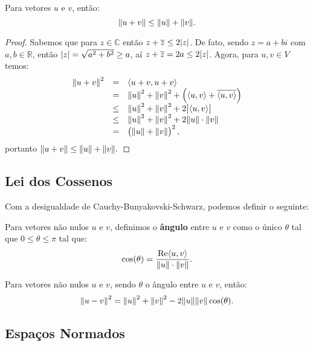 \documentclass[11pt,twoside,a4paper]{book}
\begin{document}
\begin{proposicao}\label{norma2}
Para vetores $u$ e $v$, então:
\[
\norm{u+v}\leq\norm{u}+\norm{v}.
\]
\end{proposicao}
\begin{proof}
Sabemos que para $z\in\mathbb{C}$ então $z+\overline{z}\leq 2\abs{z}$. De fato, sendo $z=a+bi$ com $a,b\in\mathbb{R}$, então $\abs{z}=\sqrt{a^2+b^2}\geq a$, aí $z+\overline{z}=2a\leq 2\abs{z}$. Agora, para $u,v\in V$ temos:
\[
\begin{array}{rcl}
\norm{u+v}^2&=&\langle u+v,u+v\rangle\\
&=&\norm{u}^2+\norm{v}^2+\left(\langle u,v\rangle+\overline{\langle u,v\rangle}\right)\\
&\leq&\norm{u}^2+\norm{v}^2+2\abs{\langle u,v\rangle}\\
&\leq&\norm{u}^2+\norm{v}^2+2\norm{u}\cdot\norm{v}\\
&=&\left(\norm{u}+\norm{v}\right)^2,
\end{array}
\]
portanto $\norm{u+v}\leq\norm{u}+\norm{v}.$
\end{proof}

\subsection{Lei dos Cossenos}

Com a desigualdade de Cauchy-Bunyakovski-Schwarz, podemos definir o seguinte:

\begin{definicao}
Para vetores não nulos $u$ e $v$, definimos o \textbf{ângulo} entre $u$ e $v$ como o único $\theta$ tal que $0\leq\theta\leq\pi$ tal que:
\[
\cos(\theta)=\frac{\mbox{Re}{\langle u,v\rangle}}{\norm{u}\cdot\norm{v}}.
\]
\end{definicao}

\begin{proposicao}
Para vetores não nulos $u$ e $v$, sendo $\theta$ o ângulo entre $u$ e $v$, então:
\[
\norm{u-v}^2=\norm{u}^2+\norm{v}^2-2\norm{u}\norm{v}\cos(\theta).
\]
\end{proposicao}

\subsection{Espaços Normados}
\end{document}
